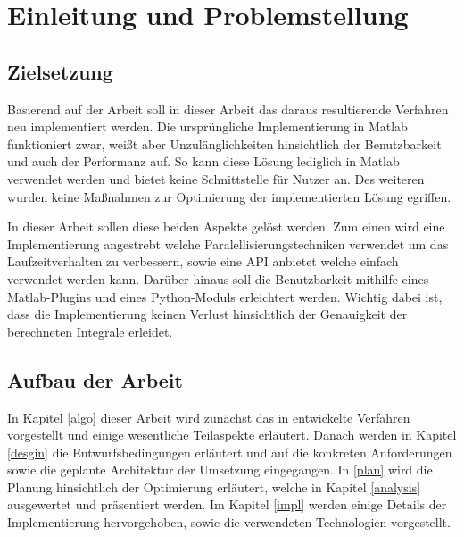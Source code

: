 \chapter{Einleitung und Problemstellung}


\section{Zielsetzung}

Basierend auf der Arbeit \cite{gasperini:hal-03209144} soll in dieser Arbeit das daraus resultierende Verfahren neu implementiert werden.
Die ursprüngliche Implementierung in Matlab funktioniert zwar, weißt aber Unzulänglichkeiten hinsichtlich der Benutzbarkeit und auch der Performanz auf.
So kann diese Lösung lediglich in Matlab verwendet werden und bietet keine Schnittstelle für Nutzer an. Des weiteren wurden keine Maßnahmen zur Optimierung der implementierten Lösung egriffen.

In dieser Arbeit sollen diese beiden Aspekte gelöst werden. Zum einen wird eine Implementierung angestrebt welche Paralellisierungstechniken verwendet um das Laufzeitverhalten zu verbessern, sowie eine API anbietet welche einfach verwendet werden kann.
Darüber hinaus soll die Benutzbarkeit mithilfe eines Matlab-Plugins und eines Python-Moduls erleichtert werden.
Wichtig dabei ist, dass die Implementierung keinen Verlust hinsichtlich der Genauigkeit der berechneten Integrale erleidet.



\section{Aufbau der Arbeit}

In Kapitel \ref{algo} dieser Arbeit wird zunächst das in \cite{gasperini:hal-03209144} entwickelte Verfahren vorgestellt und einige wesentliche Teilaspekte erläutert.
Danach werden in Kapitel \ref{desgin} die Entwurfsbedingungen erläutert und auf die konkreten Anforderungen sowie die geplante Architektur der Umsetzung eingegangen.
In \ref{plan} wird die Planung hinsichtlich der Optimierung erläutert, welche in Kapitel \ref{analysis} ausgewertet und präsentiert werden.
Im Kapitel \ref{impl} werden einige Details der Implementierung hervorgehoben, sowie die verwendeten Technologien vorgestellt.